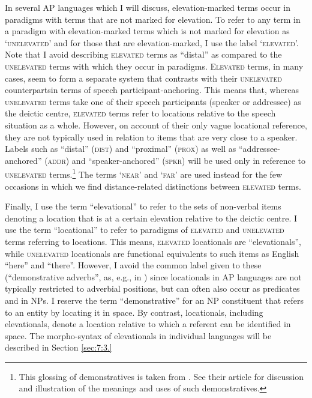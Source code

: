 \documentclass[output=paper]{LSP/langsci}
\begin{document}
In several AP languages which I will discuss, elevation-marked terms occur in paradigms with terms that are not marked for elevation. To refer to any term in a paradigm with elevation-marked terms which is not marked for elevation as `\textsc{unelevated}' and for those that are elevation-marked, I use the label `\textsc{elevated'.} Note that I avoid describing \textsc{elevated} terms as ``distal'' as compared to the \textsc{unelevated} terms with which they occur in paradigms. E\textsc{levated} terms, in many cases, seem to form a separate system that contrasts with their \textsc{unelevated} counterpartsin terms of speech participant-anchoring. This means that, whereas \textsc{unelevated} terms take one of their speech participants (speaker or addressee) as the deictic centre, \textsc{elevated} terms refer to locations relative to the speech situation as a whole. However, on account of their only vague locational reference, they are not typically used in relation to items that are very close to a speaker. Labels such as ``distal'' (\textsc{dist}) and ``proximal'' (\textsc{prox}) as well as ``addressee-anchored'' (\textsc{addr)} and ``speaker-anchored'' (\textsc{spkr)} will be used only in reference to \textsc{unelevated} terms.\footnote{{}  This glossing of demonstratives is taken from  \citet{SchapperEtAl2011}. See their article for discussion and illustration of the meanings and uses of such demonstratives.} The terms `\textsc{near}' and `\textsc{far'} are used instead for the few occasions in which we find distance-related distinctions between \textsc{elevated} terms.

Finally, I use the term ``elevational'' to refer to the sets of non-verbal items denoting a location that is at a certain elevation relative to the deictic centre. I use the term ``locational'' to refer to paradigms of \textsc{elevated} and \textsc{unelevated} terms referring to locations. This means, \textsc{elevated} locationals are ``elevationals'', while \textsc{unelevated} locationals are functional equivalents to such items as English ``here'' and ``there''. However, I avoid the common label given to these (``demonstrative adverbs'', as, e.g., in \citet{Diessel1999}) since locationals in AP languages are not typically restricted to adverbial positions, but can often also occur as predicates and in NPs. I reserve the term ``demonstrative'' for an NP constituent that refers to an entity by locating it in space. By contrast, locationals, including elevationals, denote a location relative to which a referent can be identified in space. The morpho-syntax of elevationals in individual languages will be described in Section \ref{sec:7:3.}
\end{document}
